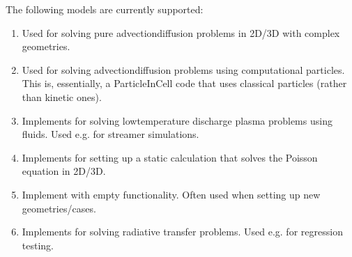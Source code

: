 \documentclass[letterpaper,10pt,english]{sphinxmanual}
\begin{document}
\sphinxAtStartPar
The following models are currently supported:
\begin{enumerate}
%
\item {} 
\sphinxAtStartPar
{\hyperref[\detokenize{Applications/AdvectionDiffusionModel:chap-advectiondiffusionmodel}]{}} Used for solving pure advection\sphinxhyphen{}diffusion problems in 2D/3D with complex geometries.

\item {} 
\sphinxAtStartPar
{\hyperref[\detokenize{Applications/BrownianWalkerModel:chap-brownianwalkermodel}]{}} Used for solving advection\sphinxhyphen{}diffusion problems using computational particles.
This is, essentially, a Particle\sphinxhyphen{}In\sphinxhyphen{}Cell code that uses classical particles (rather than kinetic ones).

\item {} 
\sphinxAtStartPar
{\hyperref[\detokenize{Applications/CdrPlasmaModel:chap-cdrplasmamodel}]{}} Implements  for solving low\sphinxhyphen{}temperature discharge plasma problems using fluids.
Used e.g. for streamer simulations.

\item {} 
\sphinxAtStartPar
{\hyperref[\detokenize{Applications/ElectrostaticsModel:chap-electrostaticsmodel}]{}} Implements  for setting up a static calculation that solves the Poisson equation in 2D/3D.

\item {} 
\sphinxAtStartPar
{\hyperref[\detokenize{Applications/GeometryModel:chap-geometrymodel}]{}} Implement  with empty functionality. Often used when setting up new geometries/cases.

\item {} 
\sphinxAtStartPar
{\hyperref[\detokenize{Applications/RadiativeTransferModel:chap-radiativetransfermodel}]{}} Implements  for solving radiative transfer problems. Used e.g. for regression testing.

\end{enumerate}
\end{document}

